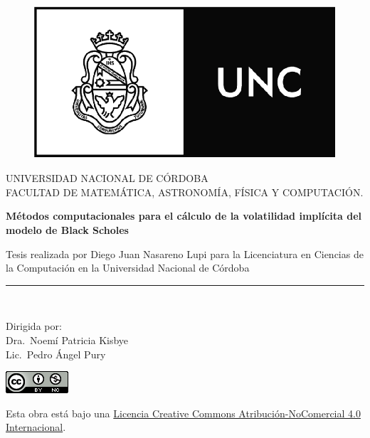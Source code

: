\documentclass[a4paper,openright, 12pt, oneside]{book}
\begin{document}


\begin{titlepage}
\begin{center}


\begin{figure}
  \begin{center}
    \leavevmode

    \includegraphics[width=0.6\linewidth]{UNCLOGO.png}
  \end{center}
\end{figure}

\vspace*{0.4in}
UNIVERSIDAD NACIONAL DE C\'ORDOBA\\
\vspace*{0.15in}
FACULTAD DE MATEM\'ATICA, ASTRONOMÍA, F\'ISICA Y COMPUTACI\'ON.\\
\vspace*{0.15in}
\begin{large}
\end{large}
\vspace*{0.2in}
\begin{Large}
\textbf{M\'etodos computacionales para el c\'alculo de la volatilidad impl\'icita del modelo de Black Scholes} \\
\end{Large}
\vspace*{0.3in}
\begin{large}
Tesis realizada por Diego Juan Nasareno Lupi para la Licenciatura en Ciencias de la Computaci\'on en la Universidad Nacional de C\'ordoba\end{large}

\vspace*{0.1in}
\rule{80mm}{0.1mm}\\
\vspace*{0.1in}
\begin{large}
Dirigida por: \\
Dra.\ Noem\'i Patricia Kisbye \\
Lic.\ Pedro \'Angel Pury\\
\vspace*{0.2in}
\end{large}
\end{center}

\begin{center}
    \includegraphics{ccmon}
\end{center}
Esta obra está bajo una \textcolor{blue}{\href{http://creativecommons.org/licenses/by-nc/4.0/}{Licencia Creative Commons Atribución-NoComercial 4.0 Internacional}}.

\end{titlepage}
\end{document}
